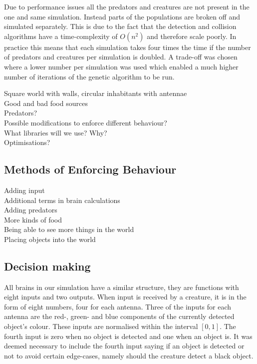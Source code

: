 \documentclass[a4paper,11pt]{kth-mag}
\begin{document}
Due to performance issues all the predators and creatures are not present in the one and same simulation. Instead parts of the populations are broken off and simulated separately. This is due to the fact that the detection and collision algorithms have a time-complexity of $O({n}^{2})$ and therefore scale poorly. In practice this means that each simulation takes four times the time if the number of predators and creatures per simulation is doubled. A trade-off was chosen where a lower number per simulation was used which enabled a much higher number of iterations of the genetic algorithm to be run.


Square world with walls, circular inhabitants with antennae\\
Good and bad food sources\\
Predators?\\
Possible modifications to enforce different behaviour?\\
What libraries will we use? Why?\\
Optimisations?\\

\subsection{Methods of Enforcing Behaviour}
Adding input\\
Additional terms in brain calculations\\
Adding predators\\
More kinds of food\\
Being able to see more things in the world\\
Placing objects into the world\\
\subsection{Decision making}
All brains in our simulation have a similar structure, they are functions with eight inputs and two outputs. When input is received by a creature, it is in the form of eight numbers, four for each antenna. Three of the inputs for each antenna are the red-, green- and blue components of the currently detected object's colour. These inputs are normalised within the interval $[0,1]$. The fourth input is zero when no object is detected and one when an object is. It was deemed necessary to include the fourth input saying if an object is detected or not to avoid certain edge-cases, namely should the creature detect a black object.
\end{document}
